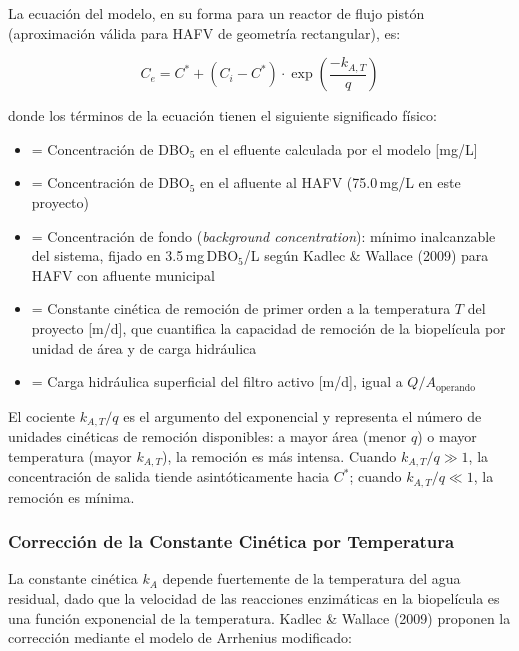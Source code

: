 \documentclass[12pt,a4paper]{article}
\begin{document}
La ecuación del modelo, en su forma para un reactor de flujo pistón (aproximación válida para HAFV de geometría rectangular), es:

\begin{equation}
C_e = C^* + (C_i - C^*) \cdot \exp\!\left(\frac{-k_{A,T}}{q}\right)
\label{eq:kC_star}
\end{equation}

donde los términos de la ecuación tienen el siguiente significado físico:

\begin{itemize}[noitemsep,leftmargin=2em]
    \item[$C_e$] = Concentración de DBO$_5$ en el efluente calculada por el modelo [mg/L]
    \item[$C_i$] = Concentración de DBO$_5$ en el afluente al HAFV (75.0\,mg/L en este proyecto)
    \item[$C^*$] = Concentración de fondo (\textit{background concentration}): mínimo inalcanzable del sistema, fijado en 3.5\,mg\,DBO$_5$/L según Kadlec \& Wallace (2009) para HAFV con afluente municipal
    \item[$k_{A,T}$] = Constante cinética de remoción de primer orden a la temperatura $T$ del proyecto [m/d], que cuantifica la capacidad de remoción de la biopelícula por unidad de área y de carga hidráulica
    \item[$q$] = Carga hidráulica superficial del filtro activo [m/d], igual a $Q / A_\text{operando}$
\end{itemize}

El cociente $k_{A,T}/q$ es el argumento del exponencial y representa el número de unidades cinéticas de remoción disponibles: a mayor área (menor $q$) o mayor temperatura (mayor $k_{A,T}$), la remoción es más intensa. Cuando $k_{A,T}/q \gg 1$, la concentración de salida tiende asintóticamente hacia $C^*$; cuando $k_{A,T}/q \ll 1$, la remoción es mínima.

\subsubsection*{Corrección de la Constante Cinética por Temperatura}

La constante cinética $k_A$ depende fuertemente de la temperatura del agua residual, dado que la velocidad de las reacciones enzimáticas en la biopelícula es una función exponencial de la temperatura. Kadlec \& Wallace (2009) proponen la corrección mediante el modelo de Arrhenius modificado:
\end{document}

